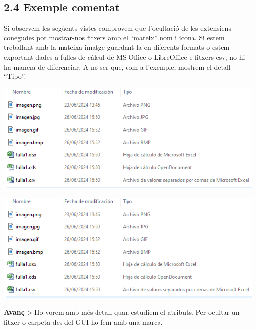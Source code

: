 \documentclass[
  a4paper,
]{article}
\begin{document}
\subsection{2.4 Exemple comentat}\label{exemple-comentat}

Si observem les següents vistes comprovem que l'ocultació de les
extensions conegudes pot mostrar-nos fitxers amb el ``mateix'' nom i
icona. Si estem treballant amb la mateixa imatge guardant-la en
diferents formats o estem exportant dades a fulles de càlcul de MS
Office o LibreOffice o fitxers csv, no hi ha manera de diferenciar. A no
ser que, com a l'exemple, mostrem el detall ``Tipo''.

\includegraphics{png/arxiusambextensioVisible.png}

\includegraphics{png/arxiusambextensioVisible.png}

\textbf{Avanç} \textgreater{} Ho vorem amb més detall quan estudiem el
atributs. Per ocultar un fitxer o carpeta des del GUI ho fem amb una
marca.
\end{document}
